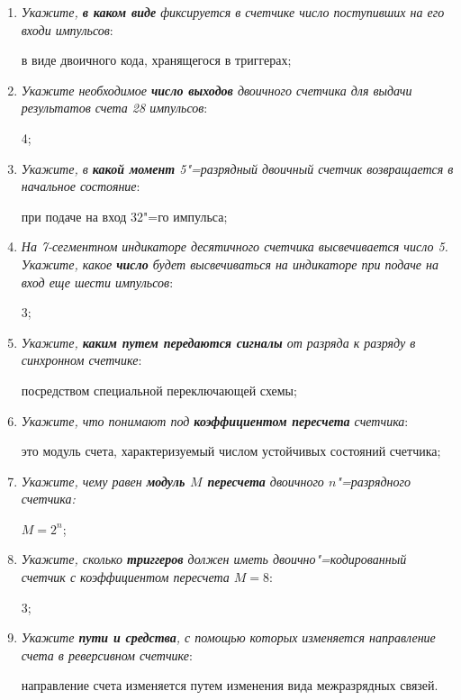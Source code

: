 \documentclass[spec, och, labwork]{shiza}
\begin{document}
\begin{enumerate}
    \item
        \textit{Укажите, \textbf{в каком виде} фиксируется в счетчике число
        поступивших на его входи импульсов}:

        в виде двоичного кода, хранящегося в триггерах;
    
    \item
        \textit{Укажите необходимое \textbf{число выходов} двоичного счетчика
        для выдачи результатов счета 28 импульсов}:

        4;

    \item
        \textit{Укажите, в \textbf{какой момент} 5"=разрядный двоичный счетчик
        возвращается в начальное состояние}:

        при подаче на вход 32"=го импульса;

    \item
        \textit{На 7-сегментном индикаторе десятичного счетчика высвечивается
        число 5. Укажите, какое \textbf{число} будет высвечиваться на индикаторе
        при подаче на вход еще шести импульсов}:

        3;
    
    \item
        \textit{Укажите, \textbf{каким путем передаются сигналы} от разряда к
        разряду в синхронном счетчике}:

        посредством специальной переключающей схемы;

    \item
        \textit{Укажите, что понимают под \textbf{коэффициентом пересчета}
        счетчика}:

        это модуль счета, характеризуемый числом устойчивых состояний счетчика;

    \item
        \textit{Укажите, чему равен \textbf{модуль $M$ пересчета} двоичного 
        $n$"=разрядного счетчика:}

        $M = 2^n$;

    \item
        \textit{Укажите, сколько \textbf{триггеров} должен иметь 
        двоично"=кодированный счетчик с коэффициентом пересчета $M = 8$}:

        3;
    
    \item
        \textit{Укажите \textbf{пути и средства}, с помощью которых изменяется
        направление счета в реверсивном счетчике}:

        направление счета изменяется путем изменения вида межразрядных связей.
\end{enumerate}
\end{document}
